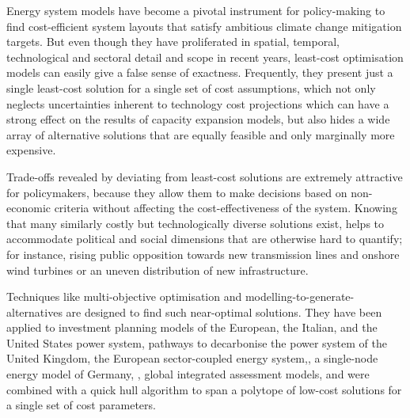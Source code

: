 
Energy system models have become a pivotal instrument for policy-making to find
cost-efficient system layouts that satisfy ambitious climate change mitigation
targets. But even though they have proliferated in spatial, temporal,
technological and sectoral detail and scope in recent years, least-cost
optimisation models can easily give a false sense of
exactness.\cite{Trutnevyte2016, pye_modelling_2020} Frequently, they present
just a single least-cost solution for a single set of cost assumptions, which
not only neglects uncertainties inherent to technology cost projections which
can have a strong effect on the results of capacity expansion models,
\cite{trondle_trade-offs_2020, yue_review_2018, pye_assessing_2018} but also
hides a wide array of alternative solutions that are equally feasible and only
marginally more expensive.\cite{nearoptimal, lombardi_policy_2020,
sasse_regional_2020}


Trade-offs revealed by deviating from least-cost solutions are extremely
attractive for policymakers, because they allow them to make decisions based on
non-economic criteria without affecting the cost-effectiveness of the system.
Knowing that many similarly costly but technologically diverse solutions exist,
helps to accommodate political and social dimensions that are otherwise hard to
quantify; for instance, rising public opposition towards new transmission lines
and onshore wind turbines or an uneven distribution of new infrastructure.
\cite{mccollum_energy_2020,sasse_regional_2020,schlachtberger_cost_2018}


Techniques like multi-objective optimisation and
modelling-to-generate-alternatives are designed to find such near-optimal
solutions. They have been applied to investment planning models of the
European,\cite{nearoptimal} the Italian, \cite{lombardi_policy_2020} and the
United States power system, \cite{DeCarolis2016} pathways to decarbonise the
power system of the United Kingdom,\cite{Li2017} the European sector-coupled
energy system,\cite{pickeringDiversityOptions2022}, a single-node energy model
of Germany, \cite{nacken_integrated_2019}, global integrated assessment models,
\cite{Price2017} and were combined with a quick hull algorithm to span a
polytope of low-cost solutions for a single set of cost
parameters.\cite{pedersen_modeling_2020}


